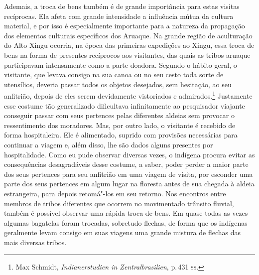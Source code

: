 Ademais, a troca de bens também é de grande importância para estas
visitas recíprocas. Ela afeta com grande intensidade a influência mútua
da cultura material, e por isso é especialmente importante para a
natureza da propagação dos elementos culturais específicos dos Aruaque.
Na grande região de aculturação do Alto Xingu ocorria, na época das
primeiras expedições ao Xingu, essa troca de bens na forma de presentes
recíprocos aos visitantes, das quais as tribos aruaque participavam
intensamente como a parte doadora. Segundo o hábito geral, o
visitante, que levava consigo na sua canoa ou no seu cesto toda sorte
de utensílios, deveria passar todos os objetos desejados, sem hesitação,
ao seu anfitrião, depois de eles serem devidamente vistoriados e
admirados.\footnote{Max Schmidt, \textit{Indianerstudien in
  Zentralbrasilien}, p.\,431 \textsc{ss}.} Justamente esse costume tão
generalizado dificultava infinitamente ao pesquisador viajante conseguir
passar com seus pertences pelas diferentes aldeias sem provocar o
ressentimento dos moradores. Mas, por outro lado, o visitante é recebido
de forma hospitaleira. Ele é alimentado, suprido com provisões
necessárias para continuar a viagem e, além disso, lhe são dados alguns
presentes por hospitalidade. Como eu pude observar diversas vezes, o
indígena procura evitar as consequências desagradáveis desse costume, a
saber, poder perder a maior parte dos seus pertences para seu anfitrião
em uma viagem de visita, por esconder uma parte dos seus pertences em
algum lugar na floresta antes de sua chegada à aldeia estrangeira, para
depois retomá"-los em seu retorno. Nos encontros entre membros de tribos
diferentes que ocorrem no movimentado trânsito fluvial, também é
possível observar uma rápida troca de bens. Em quase todas as vezes
algumas bagatelas foram trocadas, sobretudo flechas, de forma que os
indígenas geralmente levam consigo em suas viagens uma grande mistura de
flechas das mais diversas tribos.


